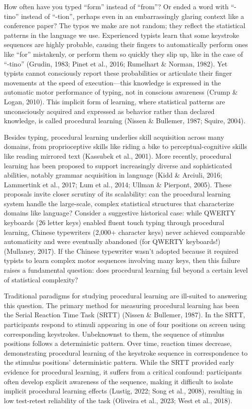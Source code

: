 \documentclass[
  10pt,
  letterpaper]{article}
\begin{document}
How often have you typed ``form'' instead of ``from''? Or ended a word
with ``-tino'' instead of ``-tion'', perhaps even in an embarrassingly
glaring context like a conference paper? The typos we make are not
random; they reflect the statistical patterns in the language we use.
Experienced typists learn that some keystroke sequences are highly
probable, causing their fingers to automatically perform ones like
``for'' mistakenly, or perform them so quickly they slip up, like in the
case of ``-tino'' (Grudin, 1983; Pinet et al., 2016; Rumelhart \&
Norman, 1982). Yet typists cannot consciously report these probabilities
or articulate their finger movements at the speed of execution---this
knowledge is expressed in the automatic motor performance of typing, not
in conscious awareness (Crump \& Logan, 2010). This implicit form of
learning, where statistical patterns are unconsciously acquired and
expressed as behavior rather than declared knowledge, is called
procedural learning (Nissen \& Bullemer, 1987; Squire, 2004).

Besides typing, procedural learning underlies skill acquisition across
many domains, from proprioceptive skills like riding a bike to
perceptual-cognitive skills like reading mirrored text (Kassubek et al.,
2001). More recently, procedural learning has been proposed to support
increasingly diverse and sophisticated abilities, notably grammar
acquisition in language (Kidd \& Arciuli, 2016; Lammertink et al., 2017;
Lum et al., 2014; Ullman \& Pierpont, 2005). These proposals invite
closer scrutiny of its scalability: can the procedural learning system
handle the large-scale, complex statistical structures that characterize
domains like language? Consider a suggestive historical case: while
QWERTY keyboards (26 letter keys) enabled fluent touch typing through
procedural learning, Chinese typewriters (2,000+ character keys) never
achieved comparable automaticity and were eventually abandoned (for
QWERTY keyboards!) (Mullaney, 2017). If the Chinese typewriter wasn't
adopted because it required typists to learn complex motor sequences
involving many keys, then this failure raises a fundamental question:
does procedural learning fail beyond a certain level of statistical
complexity?

Traditional paradigms for studying procedural learning are ill-suited to
answering this question. The primary method for measuring procedural
learning has been the Serial Reaction Time Task (SRTT) (Nissen \&
Bullemer, 1987). In the SRTT, participants respond to stimuli appearing
in one of four positions on screen using corresponding keystrokes.
Unbeknownst to them, the sequence of stimulus positions follows a
deterministic pattern. Over time, reaction times decrease, demonstrating
procedural learning of the keystroke sequence in correspondence to the
stimulus positions' deterministic pattern. While the SRTT provided early
evidence for procedural learning, it suffers from a critical confound:
participants often develop explicit awareness of the sequence, making it
difficult to isolate implicit procedural learning effects (Lustig, 2022;
Song et al., 2008), resulting in low test-retest reliability of the task
(Oliveira et al., 2023; West et al., 2018).
\end{document}

